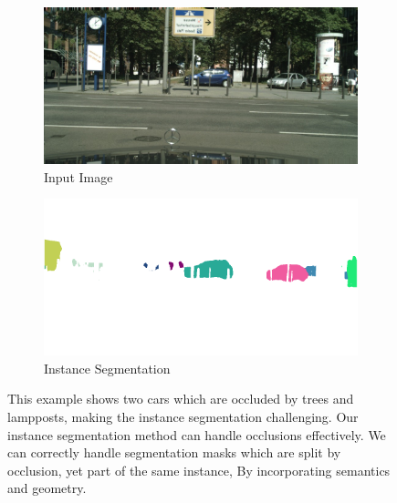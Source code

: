 \begin{figure}[t]
\begin{center}
\begin{subfigure}[t]{0.49\linewidth}
  \includegraphics[width=\linewidth,trim={350px 120px 0 100px},clip]{results/segnet_19_output_0.jpg}
  \caption{Input Image}
\end{subfigure}
\begin{subfigure}[t]{0.49\linewidth}
  \includegraphics[width=\linewidth,trim={350px 120px 0 100px},clip]{results/segnet_19_output_3.png}
  \caption{Instance Segmentation}
\end{subfigure}
\end{center}
   \caption[Instance segmentation with occlusion.]{This example shows two cars which are occluded by trees and lampposts, making the instance segmentation challenging. Our instance segmentation method can handle occlusions effectively. We can correctly handle segmentation masks which are split by occlusion, yet part of the same instance, By incorporating semantics and geometry.}
\label{fig:instancemask}
\end{figure}


